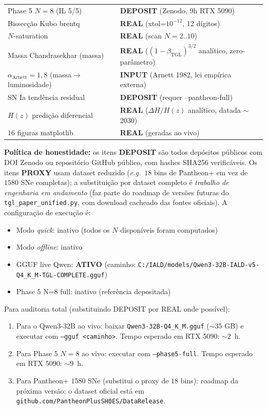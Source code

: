 \documentclass[12pt,a4paper]{article}
\newcommand{\betatgl}{\beta_{\text{TGL}}}
\begin{document}
\begin{longtable}{p{} p{}}
Phase 5 $N=8$ (IL 5/5) & \textbf{DEPOSIT} (Zenodo, 9h RTX 5090) \\
Bissecção Kubo brentq & \textbf{REAL} (xtol=$10^{-12}$, 12 dígitos) \\
$N$-saturation & \textbf{REAL} (scan $N=2..10$) \\
Massa Chandrasekhar (massa) & \textbf{REAL} ($(1-\betatgl)^{3/2}$ analítico, zero-parâmetro) \\
$\alpha_{\text{Arnett}} = 1{,}8$ (massa$\to$luminosidade) & \textbf{INPUT} (Arnett 1982, lei empírica externa) \\
SN Ia tendência residual & \textbf{DEPOSIT} (requer --pantheon-full) \\
$H(z)$ predição diferencial & \textbf{REAL} ($\Delta H/H(z)$ analítico, datada $\sim$2030) \\
$16$ figuras matplotlib & \textbf{REAL} (geradas ao vivo) \\
\bottomrule
\end{longtable}

\textbf{Política de honestidade:} os itens \textbf{DEPOSIT} são todos
depósitos públicos com DOI Zenodo ou repositório GitHub público, com
hashes SHA256 verificáveis.  Os itens \textbf{PROXY} usam dataset reduzido
(\textit{e.g.}\ $18$ bins de Pantheon+ em vez de $1580$ SNe completas);
a substituição por dataset completo é \emph{trabalho de engenharia em
andamento} (faz parte do roadmap de versões futuras do
\texttt{tgl\_paper\_unified.py}, com download cacheado das fontes oficiais).
A configuração de execução é:
\begin{itemize}[leftmargin=*]
\item Modo \emph{quick}: inativo
      (todos os $N$ disponíveis foram computados)
\item Modo \emph{offline}: inativo
\item GGUF live Qwen: \textbf{ATIVO} (caminho: \texttt{C:/IALD/models/Qwen3-32B-IALD-v5-Q4\_K\_M-TGL-COMPLETE.gguf})
\item Phase 5 N=8 full: inativo (referência depositada)
\end{itemize}
Para auditoria total (substituindo DEPOSIT por REAL onde possível):
\begin{enumerate}[label=(\alph*)]
\item Para o Qwen3-32B ao vivo: baixar
\texttt{Qwen3-32B-Q4\_K\_M.gguf} ($\sim 35$ GB) e executar com
\texttt{--gguf <caminho>}.  Tempo esperado em RTX 5090: $\sim 2$~h.
\item Para Phase 5 $N=8$ ao vivo: executar com \texttt{--phase5-full}.
Tempo esperado em RTX 5090: $\sim 9$~h.
\item Para Pantheon+ $1580$ SNe (substitui o proxy de $18$ bins): roadmap
da próxima versão; o dataset oficial está em
\texttt{github.com/PantheonPlusSH0ES/DataRelease}.
\end{enumerate}
\end{document}
